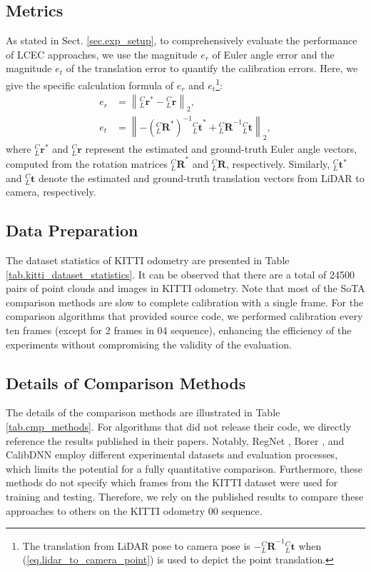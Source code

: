 \subsection{Metrics}
As stated in Sect. \ref{sec.exp_setup}, to comprehensively evaluate the performance of LCEC approaches, we use the magnitude $e_r$ of Euler angle error and the magnitude $e_t$ of the translation error to quantify the calibration errors. Here, we give the specific calculation formula of $e_r$ and $e_t$\footnote{The translation from LiDAR pose to camera pose is $-{{^{C}_{L}\boldsymbol{R}}^{-1}}{{^C_L}\boldsymbol{t}}$ when (\ref{eq.lidar_to_camera_point}) is used to depict the point translation.}:
\begin{equation}
\begin{aligned}
e_r &=  \left\|{{^C_L}\boldsymbol{r}^*} - {{^C_L}\boldsymbol{r}}\right\|_2, \\
e_t &= \left\|-{({^{C}_{L}\boldsymbol{R}^*})^{-1}}{{^C_L}\boldsymbol{t}}^* +{{^{C}_{L}\boldsymbol{R}}^{-1}}{{^C_L}\boldsymbol{t}}\right\|_2,
\end{aligned}
\label{exp_metrics}
\end{equation}
where ${{^C_L}\boldsymbol{r}^{*}}$ and ${{^C_L}\boldsymbol{r}}$ represent the estimated and ground-truth Euler angle vectors, computed from the rotation matrices ${^{C}_{L}\boldsymbol{R}}^*$ and ${^{C}_{L}\boldsymbol{R}}$, respectively. Similarly, ${^C_L}\boldsymbol{t}^*$ and ${^C_L}\boldsymbol{t}$ denote the estimated and ground-truth translation vectors from LiDAR to camera, respectively.



\subsection{Data Preparation}
The dataset statistics of KITTI odometry are presented in Table \ref{tab.kitti_dataset_statistics}. It can be observed that there are a total of 24500 pairs of point clouds and images in KITTI odometry. Note that most of the SoTA comparison methods are slow to complete calibration with a single frame. For the comparison algorithms that provided source code, we performed calibration every ten frames (except for 2 frames in 04 sequence), enhancing the efficiency of the experiments without compromising the validity of the evaluation. 

\subsection{Details of Comparison Methods}
The details of the comparison methods are illustrated in Table \ref{tab.cmp_methods}. For algorithms that did not release their code, we directly reference the results published in their papers. Notably, RegNet \cite{schneider2017regnet}, Borer \etal \cite{borer2024chaos}, and CalibDNN \cite{zhao2021calibdnn} employ different experimental datasets and evaluation processes, which limits the potential for a fully quantitative comparison. Furthermore, these methods do not specify which frames from the KITTI dataset were used for training and testing. Therefore, we rely on the published results to compare these approaches to others on the KITTI odometry 00 sequence.


